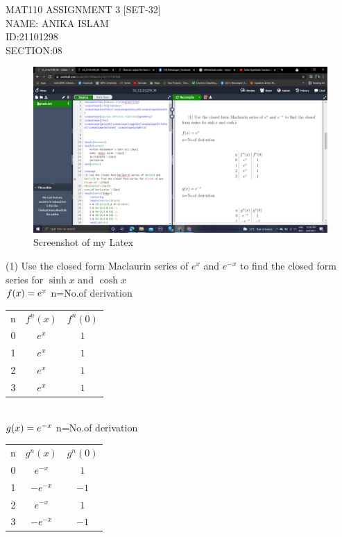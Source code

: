 \documentclass[a4paper,17pt]{extarticle}
\begin{document}
\begin{center}
    MAT110 ASSIGNMENT 3 [SET-32]\\[6pt]
    NAME: ANIKA ISLAM \\[6pt]
    ID:21101298 \\[6pt]
    SECTION:08
\end{center}

\newpage
\begin{figure}[htbh!]
    \centering
    \includegraphics[width=1\linewidth]{SET 32.png}
    \caption{Screenshot of my Latex}
\end{figure}
\newpage
(1) Use the closed form Maclaurin series of $e^{x}$ and $e^{-x}$ to find the closed form series for $\sinh x$ and $\cosh x$ \\[20pt]
$f(x)=e^{x}\\[6pt]$
n=No.of derivation \\[6pt]
\begin{table}[htbp!]
    \centering
    \begin{tabular}{c|c|c}
    n & $f^{n}(x)$ & $f^{n}(0)$\\
    0 & $e^{x}$ & $1$ \\
    1 & $e^{x}$ & $1$ \\
    2 & $e^{x}$ & $1$ \\
    3 & $e^{x}$ & $1$ \\
    \end{tabular}
\end{table} \\[6pt]
$g(x)=e^{-x}\\[6pt]$
n=No.of derivation \\[6pt]
\begin{table}[htbp!]
    \centering
    \begin{tabular}{c|c|c}
    n & $g^{n}(x)$ & $g^{n}(0)$\\
    0 & $e^{-x}$ & $1$ \\
    1 & $-e^{-x}$ & $-1$ \\
    2 & $e^{-x}$ & $1$ \\
    3 & $-e^{-x}$ & $-1$ \\
    \end{tabular}
\end{table} \\[30pt]
\end{document}
